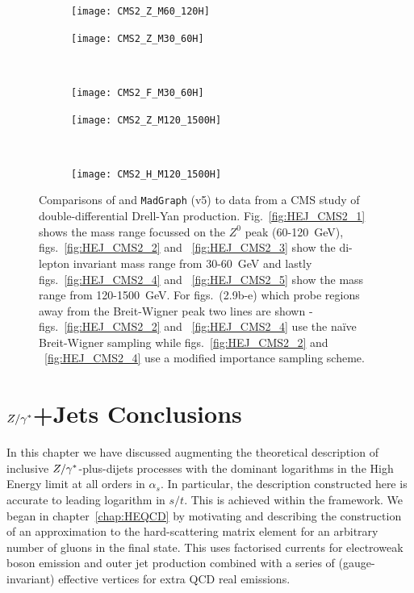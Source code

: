 		\begin{figure}[h]
			\centering
			\begin{subfigure}[b]{0.47\textwidth}
				\texttt{[image: CMS2\_Z\_M60\_120H]}
				\caption{}
				\label{fig:HEJ_CMS2_1}
			\end{subfigure}

			\begin{subfigure}[b]{0.47\textwidth}
				\texttt{[image: CMS2\_Z\_M30\_60H]}
				\caption{}
				\label{fig:HEJ_CMS2_2}
			\end{subfigure}
			~
			\begin{subfigure}[b]{0.47\textwidth}
				\texttt{[image: CMS2\_F\_M30\_60H]}
				\caption{}
				\label{fig:HEJ_CMS2_3}
			\end{subfigure}

			\begin{subfigure}[b]{0.47\textwidth}
				\texttt{[image: CMS2\_Z\_M120\_1500H]}
				\caption{}
				\label{fig:HEJ_CMS2_4}
			\end{subfigure}
			~
			\begin{subfigure}[b]{0.47\textwidth}
				\texttt{[image: CMS2\_H\_M120\_1500H]}
				\caption{}
				\label{fig:HEJ_CMS2_5}
			\end{subfigure}
			\caption{Comparisons of \HEJ and \texttt{MadGraph} (v5) to data from a CMS study of double-differential
			Drell-Yan production.  Fig.~\eqref{fig:HEJ_CMS2_1} shows the mass range focussed on the $Z^0$ peak
			(60-120~GeV), figs.~\eqref{fig:HEJ_CMS2_2} and ~\eqref{fig:HEJ_CMS2_3} show the di-lepton invariant
			mass range from 30-60~GeV and lastly figs.~\eqref{fig:HEJ_CMS2_4} and ~\eqref{fig:HEJ_CMS2_5} show
			the mass range from 120-1500~GeV.  For figs.~(2.9b-e) which probe regions away from the Breit-Wigner peak
			two \HEJ lines are shown - figs.~\eqref{fig:HEJ_CMS2_2} and ~\eqref{fig:HEJ_CMS2_4} use the
			na\"ive Breit-Wigner sampling while figs.~\eqref{fig:HEJ_CMS2_2} and ~\eqref{fig:HEJ_CMS2_4}
			use a modified importance sampling scheme.}
		\end{figure}

\section{$Z/\gamma^*$+Jets Conclusions}

	In this chapter we have discussed augmenting the theoretical description of
	inclusive $Z/\gamma^*$-plus-dijets processes with the dominant logarithms in the High
	Energy limit at all orders in $\alpha_s$.  In particular, the description
	constructed here is accurate to leading logarithm in $s/t$.  This is
	achieved within the \hej framework.  We began in
	chapter~\ref{chap:HEQCD} by motivating and describing the construction of an
	approximation to the hard-scattering matrix element for an arbitrary number of
	gluons in the final state.  This uses factorised currents for electroweak boson
	emission and outer jet production combined with a series of (gauge-invariant)
	effective vertices for extra QCD real emissions.

